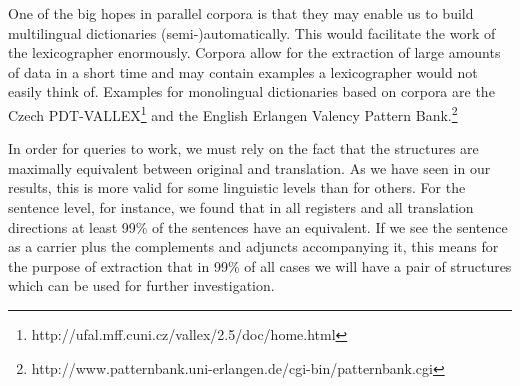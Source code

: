 \documentclass[output=paper]{LSP/langsci}
\begin{document}
One of the big hopes in parallel corpora is that they may enable us to build multilingual  dictionaries (semi-)automatically. This would facilitate the work of the lexicographer enormously. Corpora allow for the extraction of large amounts of data in a short time and may contain examples a lexicographer would not easily think of. Examples for monolingual  dictionaries based on corpora are the Czech PDT-VALLEX\footnote{http://ufal.mff.cuni.cz/vallex/2.5/doc/home.html} and the English Erlangen Valency Pattern Bank.\footnote{http://www.patternbank.uni-erlangen.de/cgi-bin/patternbank.cgi}

In order for  queries to work, we must rely on the fact that the structures are maximally equivalent between original and translation. As we have seen in our results, this is more valid for some linguistic levels than for others. For the sentence level, for instance, we found that in all registers and all translation directions at least 99\% of the sentences have an equivalent. If we see the sentence as a  carrier plus the complements and adjuncts accompanying it, this means for the purpose of  extraction that in 99\% of all cases we will have a pair of structures which can be used for further investigation.
\end{document}
